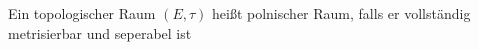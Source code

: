 Ein topologischer Raum $(E,\tau)$ heißt polnischer Raum, falls er vollständig metrisierbar und seperabel ist